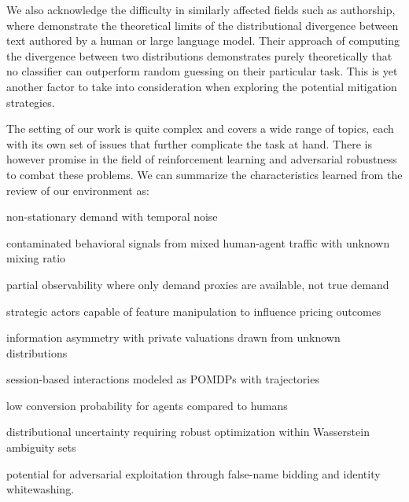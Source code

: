 We also acknowledge the difficulty in similarly affected fields such as authorship, where \textcite{ganie_uncertainty_2025} demonstrate the theoretical limits of the distributional divergence between text authored by a human or large language model. Their approach of computing the divergence between two distributions demonstrates purely theoretically that no classifier can outperform random guessing on their particular task. This is yet another factor to take into consideration when exploring the potential mitigation strategies.

The setting of our work is quite complex and covers a wide range of topics, each with its own set of issues that further complicate the task at hand. There is however promise in the field of reinforcement learning and adversarial robustness to combat these problems. We can summarize the characteristics learned from the review of our environment as:
\begin{enumerate*}[label=(\roman*)]
\item non-stationary demand with temporal noise
\item contaminated behavioral signals from mixed human-agent traffic with unknown mixing ratio
\item partial observability where only demand proxies are available, not true demand
\item strategic actors capable of feature manipulation to influence pricing outcomes
\item information asymmetry with private valuations drawn from unknown distributions
\item session-based interactions modeled as POMDPs with trajectories
\item low conversion probability for agents compared to humans
\item distributional uncertainty requiring robust optimization within Wasserstein ambiguity sets
\item potential for adversarial exploitation through false-name bidding and identity whitewashing.
\end{enumerate*}
